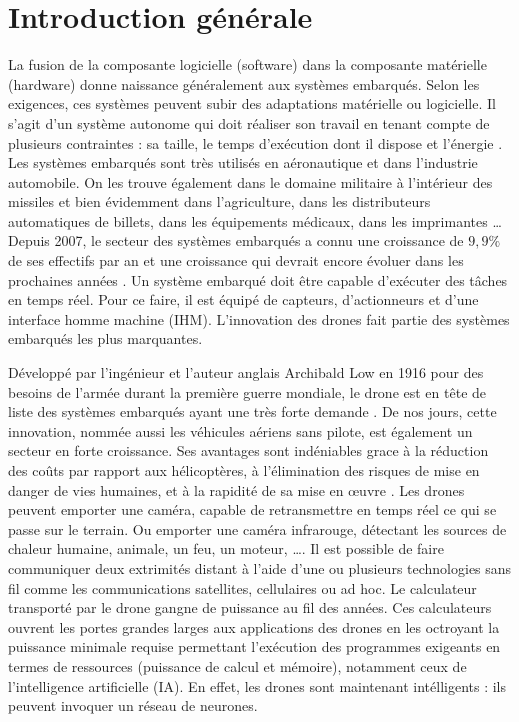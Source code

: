\chapter*{Introduction générale}
La fusion de la composante logicielle (software) dans la composante matérielle (hardware) donne naissance généralement aux systèmes embarqués.
Selon les exigences, ces systèmes peuvent subir des adaptations matérielle ou logicielle. Il s'agit d'un système autonome qui doit réaliser son travail en tenant compte de plusieurs contraintes : sa taille, le temps d'exécution dont il dispose et l'énergie \cite{FUTURA}. Les systèmes embarqués sont très utilisés en aéronautique et dans l'industrie automobile. On les trouve également dans le domaine militaire à l'intérieur des missiles et bien évidemment dans l'agriculture, dans les distributeurs automatiques de billets, dans les équipements médicaux, dans les imprimantes \ldots
Depuis 2007, le secteur des systèmes embarqués a connu une croissance de $9,9\%$ de ses effectifs par an  et une croissance qui devrait encore évoluer dans les prochaines années \cite{PierreAudoin}. 
Un système embarqué doit être capable d'exécuter des tâches en temps réel. 
Pour ce faire, il est équipé de capteurs, d'actionneurs et d'une interface homme machine (IHM). 
L'innovation des drones fait partie des systèmes embarqués les plus marquantes. 

Développé par l'ingénieur et l'auteur anglais Archibald Low en 1916 pour des besoins de l'armée durant la première guerre mondiale, le drone est en tête de liste des systèmes embarqués ayant une très forte demande \cite{STUDIOFLY}.  
De nos jours, cette innovation, nommée aussi les véhicules aériens sans pilote, est également un secteur en forte croissance. 
Ses avantages sont indéniables grace à la réduction des coûts par rapport aux hélicoptères, à l'élimination des risques de mise en danger de vies humaines, et à la rapidité de sa mise en œuvre \cite{STUDIOFLYa}. 
Les drones peuvent emporter une caméra, capable de retransmettre en temps réel ce qui se passe sur le terrain. 
Ou emporter une caméra infrarouge, détectant les sources de chaleur humaine, animale, un feu, un moteur, \ldots .
Il est possible de faire communiquer deux extrimités distant à l'aide d'une ou plusieurs technologies sans fil comme les communications satellites, cellulaires ou ad hoc.
Le calculateur transporté par le drone gangne de puissance au fil des années. Ces calculateurs ouvrent les portes grandes larges aux applications des drones en les octroyant la puissance minimale requise permettant l'exécution des programmes exigeants en termes de ressources (puissance de calcul et mémoire), notamment ceux de l'intelligence artificielle (IA). En effet, les drones sont maintenant intélligents : ils peuvent invoquer un réseau de neurones.

